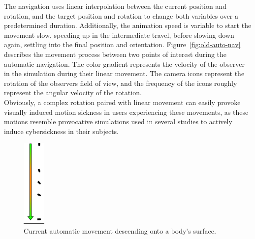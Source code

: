 The navigation uses linear interpolation between the current position and rotation, and the target position and
rotation to change both variables over a predetermined duration.
Additionally, the animation speed is variable to start the movement slow, speeding up in the intermediate travel,
before slowing down again, settling into the final position and orientation.
Figure~\ref{fig:old-auto-nav} describes the movement process between two points of interest during the automatic
navigation.
The color gradient represents the velocity of the observer in the simulation during their linear movement.
The camera icons represent the rotation of the observers field of view, and the frequency of the icons roughly
represent the angular velocity of the rotation.
\\
Obviously, a complex rotation paired with linear movement can easily provoke visually induced motion sickness in
users experiencing these movements, as these motions resemble provocative simulations used in several studies to
actively induce cybersickness in their subjects.
\\

\begin{figure}
    \centering
    \includegraphics[width=0.1\textwidth]{content/3_current_state/img/OldAutomaticNavigation_Landing}
    \caption{Current automatic movement descending onto a body's surface.}
    \label{fig:old-auto-nav-descend}
\end{figure}


